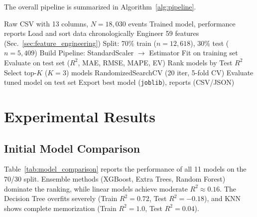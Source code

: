 \documentclass[journal,10pt,twocolumn]{IEEEtran}
\begin{document}
The overall pipeline is summarized in Algorithm~\ref{alg:pipeline}.

\begin{algorithm}[!t]
\caption{ML Pipeline for Magnitude Estimation}
\label{alg:pipeline}
\begin{algorithmic}[1]
\REQUIRE Raw CSV with 13 columns, $N = 18{,}030$ events
\ENSURE Trained model, performance reports
\STATE Load and sort data chronologically
\STATE Engineer 59 features (Sec.~\ref{sec:feature_engineering})
\STATE Split: 70\% train ($n = 12{,}618$), 30\% test ($n = 5{,}409$)
    \STATE Build Pipeline: StandardScaler $\rightarrow$ Estimator
    \STATE Fit on training set
    \STATE Evaluate on test set ($R^2$, MAE, RMSE, MAPE, EV)
\ENDFOR
\STATE Rank models by Test $R^2$
\STATE Select top-$K$ ($K=3$) models
    \STATE RandomizedSearchCV (20 iter, 5-fold CV)
    \STATE Evaluate tuned model on test set
\ENDFOR
\STATE Export best model (\texttt{joblib}), reports (CSV/JSON)
\end{algorithmic}
\end{algorithm}

\section{Experimental Results}
\label{sec:results}

\subsection{Initial Model Comparison}

Table~\ref{tab:model_comparison} reports the performance of all 11 models on the 70/30 split. Ensemble methods (XGBoost, Extra Trees, Random Forest) dominate the ranking, while linear models achieve moderate $R^2 \approx 0.16$. The Decision Tree overfits severely (Train $R^2 = 0.72$, Test $R^2 = -0.18$), and KNN shows complete memorization (Train $R^2 = 1.0$, Test $R^2 = 0.04$).
\end{document}
